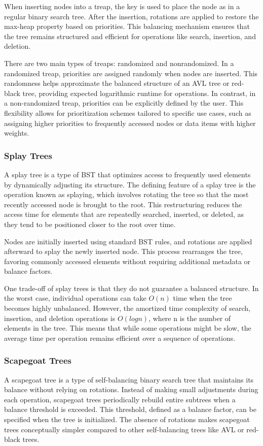\documentclass[sigconf]{acmart}
\begin{document}
When inserting nodes into a treap, the key is used to place the node as in a regular binary search tree. After the insertion, rotations are applied to restore the max-heap property based on priorities. This balancing mechanism ensures that the tree remains structured and efficient for operations like search, insertion, and deletion.

There are two main types of treaps: randomized and nonrandomized. In a randomized treap, priorities are assigned randomly when nodes are inserted. This randomness helps approximate the balanced structure of an AVL tree or red-black tree, providing expected logarithmic runtime for operations. In contrast, in a non-randomized treap, priorities can be explicitly defined by the user. This flexibility allows for prioritization schemes tailored to specific use cases, such as assigning higher priorities to frequently accessed nodes or data items with higher weights.

\subsubsection{Splay Trees \cite{splaytree_ds}}
A splay tree is a type of BST that optimizes access to frequently used elements by dynamically adjusting its structure. The defining feature of a splay tree is the operation known as splaying, which involves rotating the tree so that the most recently accessed node is brought to the root. This restructuring reduces the access time for elements that are repeatedly searched, inserted, or deleted, as they tend to be positioned closer to the root over time.

Nodes are initially inserted using standard BST rules, and rotations are applied afterward to splay the newly inserted node. This process rearranges the tree, favoring commonly accessed elements without requiring additional metadata or balance factors.

One trade-off of splay trees is that they do not guarantee a balanced structure. In the worst case, individual operations can take $O(n)$ time when the tree becomes highly unbalanced. However, the amortized time complexity of search, insertion, and deletion operations is $O(logn)$, where n is the number of elements in the tree. This means that while some operations might be slow, the average time per operation remains efficient over a sequence of operations.

\subsubsection{Scapegoat Trees \cite{scapegoat_ds}}
A scapegoat tree is a type of self-balancing binary search tree that maintains its balance without relying on rotations. Instead of making small adjustments during each operation, scapegoat trees periodically rebuild entire subtrees when a balance threshold is exceeded. This threshold, defined as a balance factor, can be specified when the tree is initialized. The absence of rotations makes scapegoat trees conceptually simpler compared to other self-balancing trees like AVL or red-black trees.
\end{document}
